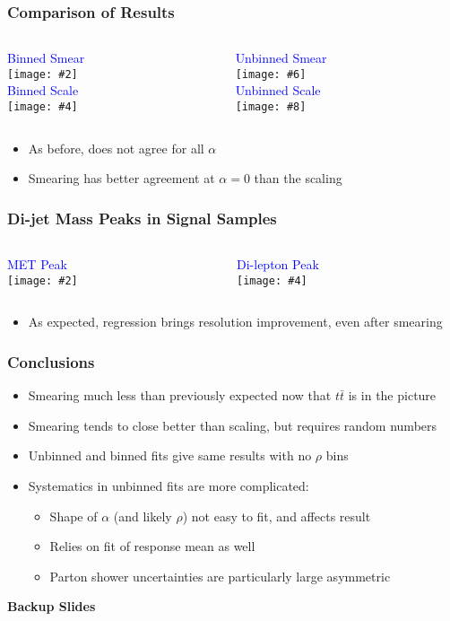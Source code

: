 \documentclass{beamer}
\newcommand{\beginbackup}{
  \newcounter{framenumbervorappendix}
  \setcounter{framenumbervorappendix}{\value{framenumber}}
}
\newcommand{\backupend}{
  \addtocounter{framenumbervorappendix}{-\value{framenumber}}
  \addtocounter{framenumber}{\value{framenumbervorappendix}}
}
\newcommand{\twofigs}[4]{
  \begin{columns}
    \begin{column}{0.5\linewidth}
      \centering
      \textcolor{blue}{#1} \\
      \texttt{[image: \#2]}
    \end{column}
    \begin{column}{0.5\linewidth}
      \centering
      \textcolor{blue}{#3} \\
      \texttt{[image: \#4]}
    \end{column}
  \end{columns}
}
\newcommand{\fourfigs}[8]{
  \begin{columns}
    \begin{column}{0.3\linewidth}
      \centering
      \textcolor{blue}{#1} \\
      \texttt{[image: \#2]} \\
      \textcolor{blue}{#3} \\
      \texttt{[image: \#4]}
    \end{column}
    \begin{column}{0.3\linewidth}
      \centering
      \textcolor{blue}{#5} \\
      \texttt{[image: \#6]} \\
      \textcolor{blue}{#7} \\
      \texttt{[image: \#8]}
    \end{column}
  \end{columns}
}
\begin{document}
\begin{frame}
  \frametitle{Comparison of Results}

  \fourfigs{Binned Smear}
           {200122_comparison_resolution/resolution_jet1_response_single_smear_nominal_smear_0.pdf}
           {Binned Scale}
           {200122_comparison_resolution/resolution_jet1_response_single_scale_nominal_smear_0.pdf}
           {Unbinned Smear}
           {200122_comparison_resolution/resolution_jet1_response_unbinned_smear_nominal_smear_0.pdf}
           {Unbinned Scale}
           {200122_comparison_resolution/resolution_jet1_response_unbinned_scale_nominal_smear_0.pdf}

  \begin{itemize}
  \item As before, does not agree for all $\alpha$
  \item Smearing has better agreement at $\alpha = 0$ than the scaling
  \end{itemize}

\end{frame}


\begin{frame}
  \frametitle{Di-jet Mass Peaks in Signal Samples}

  \twofigs{MET Peak}
          {200122_peak_met/comparison.pdf}
          {Di-lepton Peak}
          {200122_peak_lep/comparison.pdf}

  \begin{itemize}
  \item As expected, regression brings resolution improvement,
    even after smearing
  \end{itemize}

\end{frame}


\begin{frame}
  \frametitle{Conclusions}

  \begin{itemize}
  \item Smearing much less than previously expected now that $t\bar{t}$ is in the picture
  \item Smearing tends to close better than scaling, but requires random numbers
  \item Unbinned and binned fits give same results with no $\rho$ bins
  \item Systematics in unbinned fits are more complicated:
    \begin{itemize}
    \item Shape of $\alpha$ (and likely $\rho$) not easy to fit, and affects result
    \item Relies on fit of response mean as well
    \item Parton shower uncertainties are particularly large asymmetric
    \end{itemize}
  \end{itemize}

\end{frame}


\beginbackup

\begin{frame}
  \centering
    {\Huge \bf\sffamily Backup Slides}
\end{frame}



\backupend
\end{document}

